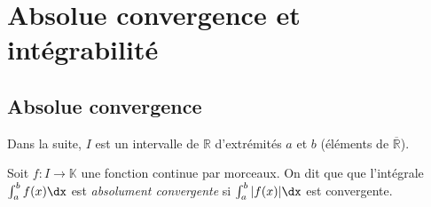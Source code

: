 \documentclass[a4paper,10pt]{report}
\begin{document}
%
%
%
%

\section{Absolue convergence et intégrabilité}

\subsection{Absolue convergence}

\noindent Dans la suite, $I$ est un intervalle de $\mathbb{R}$ d'extrémités $a$ et $b$ (éléments de $\overline{\mathbb{R}}$).

\begin{defin} Soit $f : I \rightarrow \mathbb{K}$ une fonction continue par morceaux. On dit que que l'intégrale $\int_{a}^b f(x) \dx$ est \textit{absolument convergente} si $\int_{a}^b \vert f(x) \vert \dx$ est convergente.
\end{defin}
\end{document}
